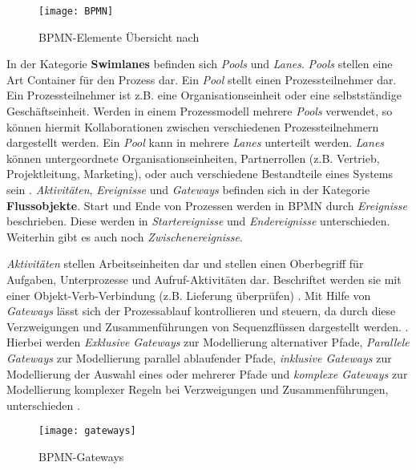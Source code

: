 \begin{figure}[htp]
\begin{center}
  \texttt{[image: BPMN]} %
  \caption{BPMN-Elemente Übersicht nach \cite{gpfert2012}}
  \label{fig:BPMN}
\end{center}
\end{figure}
In der Kategorie \textbf{Swimlanes} befinden sich \textit{Pools} und \textit{Lanes}. \textit{Pools} stellen eine Art Container für den Prozess dar. Ein \textit{Pool} stellt einen Prozessteilnehmer dar. Ein Prozessteilnehmer ist z.B. eine Organisationseinheit oder eine selbstständige Geschäftseinheit. Werden in einem Prozessmodell mehrere \textit{Pools} verwendet, so können hiermit Kollaborationen zwischen verschiedenen Prozessteilnehmern dargestellt werden. Ein \textit{Pool} kann in mehrere \textit{Lanes} unterteilt werden. \textit{Lanes} können untergeordnete Organisationseinheiten, Partnerrollen (z.B. Vertrieb, Projektleitung, Marketing), oder auch verschiedene Bestandteile eines Systems sein \cite{gpfert2012, pitschke2010, allweyer2013}. \newline
\textit{Aktivitäten}, \textit{Ereignisse} und \textit{Gateways} befinden sich in der Kategorie \textbf{Flussobjekte}.
Start und Ende von Prozessen werden in BPMN durch \textit{Ereignisse} beschrieben. Diese werden in  \textit{Startereignisse} und \textit{Endereignisse} unterschieden.  Weiterhin gibt es auch noch \textit{Zwischenereignisse}. \newline

\textit{Aktivitäten} stellen Arbeitseinheiten dar und stellen einen Oberbegriff für Aufgaben, Unterprozesse und Aufruf-Aktivitäten dar. Beschriftet werden sie mit einer Objekt-Verb-Verbindung (z.B. Lieferung überprüfen) \cite{gpfert2012}. \newline
Mit Hilfe von \textit{Gateways} lässt sich der Prozessablauf kontrollieren und steuern, da durch diese Verzweigungen und Zusammenführungen von Sequenzflüssen dargestellt werden. \cite{gpfert2012, allweyer2013}. Hierbei werden \textit{Exklusive Gateways} zur Modellierung alternativer Pfade, \textit{Parallele Gateways} zur Modellierung parallel ablaufender Pfade, \textit{inklusive Gateways} zur Modellierung der Auswahl eines oder mehrerer Pfade und \textit{komplexe Gateways} zur Modellierung komplexer Regeln bei Verzweigungen und Zusammenführungen, unterschieden \cite{allweyer2013}.\newline 

\begin{figure}[H]
\begin{center}
  \texttt{[image: gateways]} %
  \caption{BPMN-Gateways}
  \label{fig:gateways}
\end{center}
\end{figure} 


